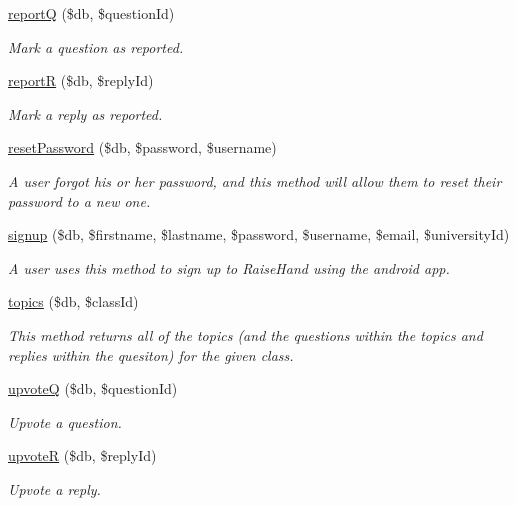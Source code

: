 \begin{DoxyCompactItemize}
\mbox{\hyperlink{androidApi_8php_ac56862a233d867f66572c317e72866b7}{reportQ}} (\$db, \$question\+Id)
\begin{DoxyCompactList}\small\item\em Mark a question as reported. \end{DoxyCompactList}\item 
\mbox{\hyperlink{androidApi_8php_aed1a7d6c08dece8c10b1c3c726e7c50b}{reportR}} (\$db, \$reply\+Id)
\begin{DoxyCompactList}\small\item\em Mark a reply as reported. \end{DoxyCompactList}\item 
\mbox{\hyperlink{androidApi_8php_a179c12250cf5b1588f807d5a5bf2f0e8}{reset\+Password}} (\$db, \$password, \$username)
\begin{DoxyCompactList}\small\item\em A user forgot his or her password, and this method will allow them to reset their password to a new one. \end{DoxyCompactList}\item 
\mbox{\hyperlink{androidApi_8php_aba9904dd1dc956ba7c25a57845795f7d}{signup}} (\$db, \$firstname, \$lastname, \$password, \$username, \$email, \$university\+Id)
\begin{DoxyCompactList}\small\item\em A user uses this method to sign up to Raise\+Hand using the android app. \end{DoxyCompactList}\item 
\mbox{\hyperlink{androidApi_8php_af7b48e32216e3eb11e83b4c1802f0356}{topics}} (\$db, \$class\+Id)
\begin{DoxyCompactList}\small\item\em This method returns all of the topics (and the questions within the topics and replies within the quesiton) for the given class. \end{DoxyCompactList}\item 
\mbox{\hyperlink{androidApi_8php_a5126929d73d19f6e5b0bc884e2998d2a}{upvoteQ}} (\$db, \$question\+Id)
\begin{DoxyCompactList}\small\item\em Upvote a question. \end{DoxyCompactList}\item 
\mbox{\hyperlink{androidApi_8php_a1b2a3c2818391760924add8c6310308f}{upvoteR}} (\$db, \$reply\+Id)
\begin{DoxyCompactList}\small\item\em Upvote a reply. \end{DoxyCompactList}\end{DoxyCompactItemize}


